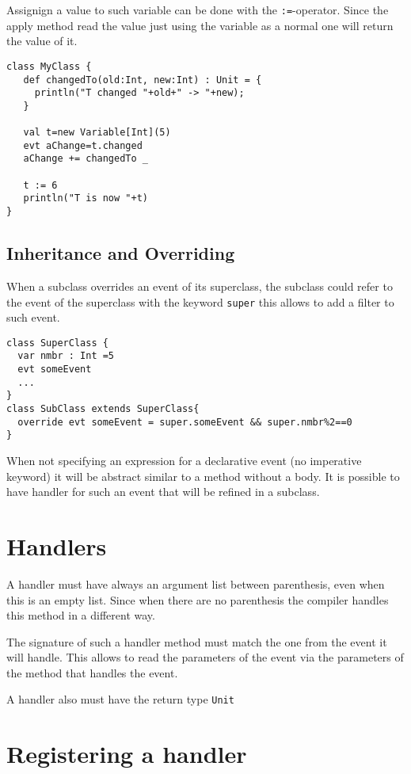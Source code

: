 \documentclass{article}
\begin{document}
Assignign a value to such variable can be done with the {\tt:=}-operator.
Since the apply method read the value just using the variable as
a normal one will return the value of it.

\begin{lstlisting}
class MyClass {
   def changedTo(old:Int, new:Int) : Unit = { 
     println("T changed "+old+" -> "+new);
   }

   val t=new Variable[Int](5)
   evt aChange=t.changed
   aChange += changedTo _

   t := 6
   println("T is now "+t)
}
\end{lstlisting}



\subsection{Inheritance and Overriding} 
When a subclass overrides an event of its superclass, the subclass could
refer to the event of the superclass with the keyword {\tt super}
this allows to add a filter to such event.

\begin{lstlisting}
class SuperClass {
  var nmbr : Int =5
  evt someEvent 
  ...
}
class SubClass extends SuperClass{
  override evt someEvent = super.someEvent && super.nmbr%2==0
}
\end{lstlisting}


When not specifying an expression for a declarative event
(no imperative keyword) it will be abstract similar to a method without 
a body. It is possible to have handler for such an event that will 
be refined in a subclass.

\section{Handlers}
 A handler must have always an argument list between parenthesis,
even when this is an empty list. Since when there are no parenthesis 
the compiler handles this method in a different way. 

The signature of such a handler method must match the one from the
event it will handle. This allows to read the parameters of the
event via the parameters of the method that handles the event.

A handler also must have the return type {\tt Unit} 

\section{Registering a handler}
\end{document}

